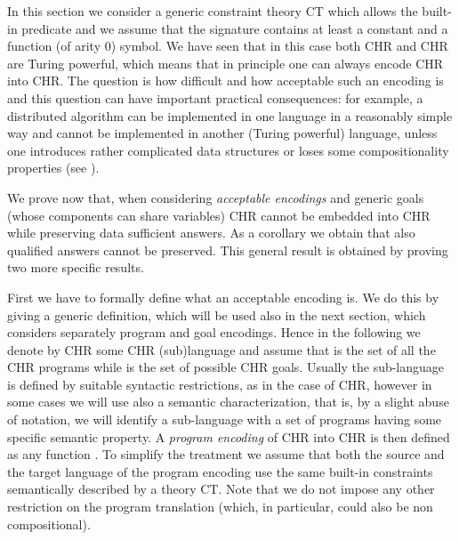 



In this section we consider a generic constraint theory CT  which allows the built-in predicate  and we assume that the signature contains at least a constant and a function (of arity  0) symbol. We have seen that in this case both CHR and CHR are Turing powerful, which means that in principle one can always encode CHR into CHR. The question is how difficult and how acceptable such an encoding is and this question can have important practical consequences: for example, a distributed algorithm can be implemented in one language in a reasonably simple way and cannot be implemented in another (Turing powerful) language, unless one introduces rather complicated data structures or loses some compositionality properties (see \cite{VPP07}).


We prove now that, when considering \emph{acceptable encodings} and generic goals (whose components can share variables) CHR cannot be embedded into CHR  while preserving data sufficient answers. As a corollary we obtain that also qualified answers cannot be preserved. This general result is obtained by proving two more specific results.

First we have to formally define what an acceptable encoding is. We do this by giving a generic definition, which will be used also in the next section, which considers separately program and goal encodings. Hence in the following we denote by CHR some CHR (sub)language and assume that  is the set of all the CHR programs while  is the set of possible CHR goals. Usually the sub-language is defined by suitable syntactic restrictions, as in the case of CHR, however in some cases we will use also a semantic characterization, that is, by a slight abuse of notation, we will identify a sub-language with a set of programs having some specific semantic property.
A  \emph{program encoding} of CHR into CHR is then defined as any  function . To simplify the treatment we assume that both the source and the target language of the program encoding use the same built-in constraints semantically described by a theory CT. Note that we do not impose any other restriction on the program translation (which, in particular, could also be non compositional).

